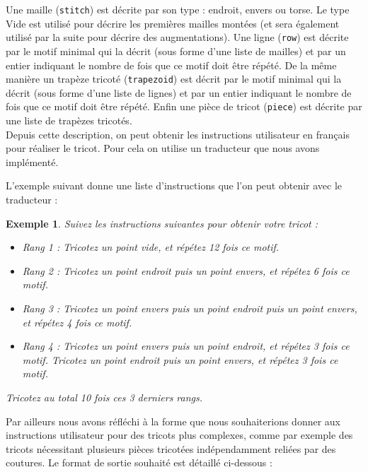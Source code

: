 \documentclass{article}
\newtheorem{ex}{Exemple}
\begin{document}
Une maille (\texttt{stitch}) est décrite par son type : endroit, envers ou torse. Le type Vide est utilisé pour décrire les premières mailles montées (et sera également utilisé par la suite pour décrire des augmentations). Une ligne (\texttt{row}) est décrite par le motif minimal qui la décrit (sous forme d'une liste de mailles) et par un entier indiquant le nombre de fois que ce motif doit être répété. De la même manière un trapèze tricoté (\texttt{trapezoid}) est décrit par le motif minimal qui la décrit (sous forme d'une liste de lignes) et par un entier indiquant le nombre de fois que ce motif doit être répété. Enfin une pièce de tricot (\texttt{piece}) est décrite par une liste de trapèzes tricotés. \\

Depuis cette description, on peut obtenir les instructions utilisateur en français pour réaliser le tricot. Pour cela on utilise un traducteur que nous avons implémenté.

L'exemple suivant donne une liste d'instructions que l'on peut obtenir avec le traducteur :

\begin{ex}
  Suivez les instructions suivantes pour obtenir votre tricot : 
  
  \begin{itemize}
  \item Rang 1 : Tricotez un point vide, et répétez 12 fois ce motif. 
  \item Rang 2 : Tricotez un point endroit puis un point envers, et répétez 6 fois ce motif. 
  \item Rang 3 : Tricotez un point envers puis un point endroit puis un point envers, et répétez 4 fois ce motif. 
  \item Rang 4 : Tricotez un point envers puis un point endroit, et répétez 3 fois ce motif. 
         Tricotez un point endroit puis un point envers, et répétez 3 fois ce motif. 
  \end{itemize}
Tricotez au total 10 fois ces 3 derniers rangs.
\end{ex}

Par ailleurs nous avons réfléchi à la forme que nous souhaiterions donner aux instructions utilisateur pour des tricots plus complexes, comme par exemple des tricots nécessitant plusieurs pièces tricotées indépendamment reliées par des coutures. Le format de sortie souhaité est détaillé ci-dessous :
\end{document}
